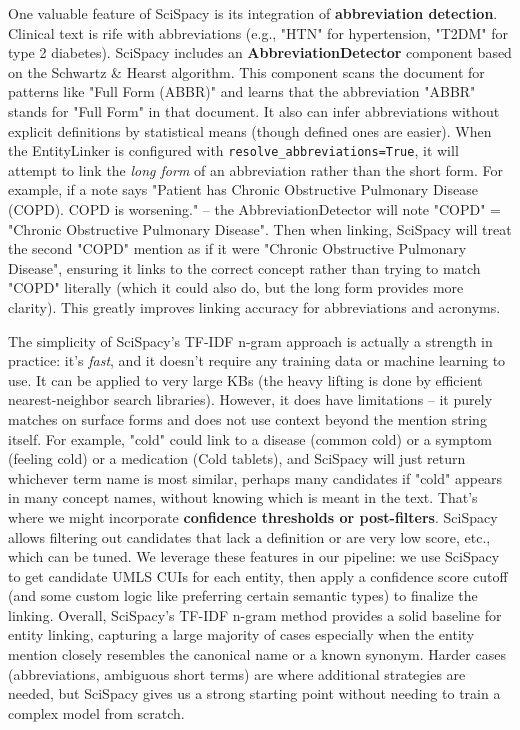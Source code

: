 One valuable feature of SciSpacy is its integration of \textbf{abbreviation detection}. Clinical text is rife with abbreviations (e.g., "HTN" for hypertension, "T2DM" for type 2 diabetes). SciSpacy includes an \textbf{AbbreviationDetector} component based on the Schwartz \& Hearst algorithm. This component scans the document for patterns like "Full Form (ABBR)" and learns that the abbreviation "ABBR" stands for "Full Form" in that document. It also can infer abbreviations without explicit definitions by statistical means (though defined ones are easier). When the EntityLinker is configured with \texttt{resolve\_abbreviations=True}, it will attempt to link the \emph{long form} of an abbreviation rather than the short form. For example, if a note says "Patient has Chronic Obstructive Pulmonary Disease (COPD). COPD is worsening." – the AbbreviationDetector will note "COPD" = "Chronic Obstructive Pulmonary Disease". Then when linking, SciSpacy will treat the second "COPD" mention as if it were "Chronic Obstructive Pulmonary Disease", ensuring it links to the correct concept rather than trying to match "COPD" literally (which it could also do, but the long form provides more clarity). This greatly improves linking accuracy for abbreviations and acronyms.

The simplicity of SciSpacy's TF-IDF n-gram approach is actually a strength in practice: it's \emph{fast}, and it doesn't require any training data or machine learning to use. It can be applied to very large KBs (the heavy lifting is done by efficient nearest-neighbor search libraries). However, it does have limitations – it purely matches on surface forms and does not use context beyond the mention string itself. For example, "cold" could link to a disease (common cold) or a symptom (feeling cold) or a medication (Cold tablets), and SciSpacy will just return whichever term name is most similar, perhaps many candidates if "cold" appears in many concept names, without knowing which is meant in the text. That's where we might incorporate \textbf{confidence thresholds or post-filters}. SciSpacy allows filtering out candidates that lack a definition or are very low score, etc., which can be tuned. We leverage these features in our pipeline: we use SciSpacy to get candidate UMLS CUIs for each entity, then apply a confidence score cutoff (and some custom logic like preferring certain semantic types) to finalize the linking. Overall, SciSpacy's TF-IDF n-gram method provides a solid baseline for entity linking, capturing a large majority of cases especially when the entity mention closely resembles the canonical name or a known synonym. Harder cases (abbreviations, ambiguous short terms) are where additional strategies are needed, but SciSpacy gives us a strong starting point without needing to train a complex model from scratch.

